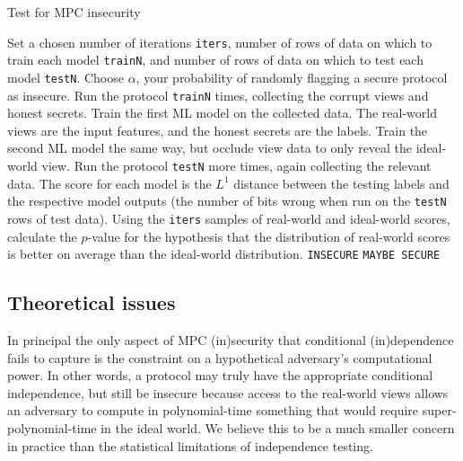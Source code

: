 \documentclass[conference]{IEEEtran}
\begin{document}
\begin{algorithm}  %
  \caption{Test for MPC insecurity}
  \begin{algorithmic}[1]
    \STATE Set a chosen number of iterations \texttt{iters},
           number of rows of data on which to train each model \texttt{trainN},
           and number of rows of data on which to test each model \texttt{testN}.
  \STATE Choose $\alpha$, your probability of randomly flagging a secure protocol as insecure.
      \STATE Run the protocol \texttt{trainN} times, collecting the corrupt views and honest secrets.
      \STATE Train the first ML model on the collected data.
             The real-world views are the input features, and the honest secrets are the labels.
      \STATE Train the second ML model the same way, but occlude view data to only reveal the ideal-world view.
      \STATE Run the protocol \texttt{testN} more times, again collecting the relevant data.
      \STATE The score for each model is the $L^1$ distance between the testing labels and the respective model outputs
             (\ie the number of bits wrong when run on the \texttt{testN} rows of test data).
    \ENDFOR
    \STATE Using the \texttt{iters} samples of real-world and ideal-world scores,
           calculate the $p$-value for the hypothesis that
           the distribution of real-world scores is better on average than the ideal-world distribution.
     \RETURN \texttt{INSECURE} \ELSE \RETURN \texttt{MAYBE SECURE} \ENDIF
  \end{algorithmic}
\end{algorithm}

\subsection{Theoretical issues}

In principal the only aspect of MPC (in)security that conditional (in)dependence fails to capture
is the constraint on a hypothetical adversary's computational power.
In other words, a protocol may truly have the appropriate conditional independence,
but still be insecure because access to the real-world views allows an adversary to compute in polynomial-time
something that would require super-polynomial-time in the ideal world.
We believe this to be a much smaller concern in practice than the statistical limitations of independence testing.
\end{document}
